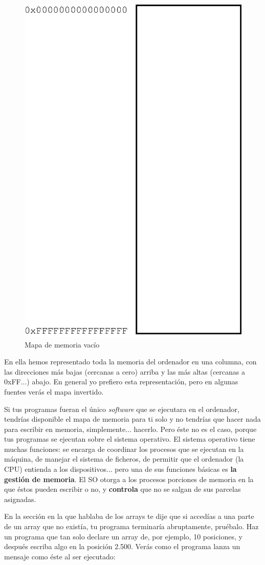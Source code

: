 \documentclass[a4paper]{article}
\begin{document}
\begin{figure}[H]
    \center
    \includegraphics[width=0.5\linewidth]{emptyMemoryMap}
    \caption{Mapa de memoria vacío}
    \label{img:emptyMemoryMap}
\end{figure}
En ella hemos representado toda la memoria del ordenador en una columna, con
las direcciones más bajas (cercanas a cero) arriba y las más altas (cercanas
a 0xFF...) abajo. En general yo prefiero esta representación, pero en algunas
fuentes verás el mapa invertido.

Si tus programas fueran el único \textit{software} que se ejecutara en el
ordenador, tendrías disponible el mapa de memoria para ti solo y no tendrías
que hacer nada para escribir en memoria, simplemente... hacerlo. Pero éste
no es el caso, porque tus programas se ejecutan sobre el sistema operativo.
El sistema operativo tiene muchas funciones: se encarga de coordinar los
procesos que se ejecutan en la máquina, de manejar el sistema de ficheros,
de permitir que el ordenador (la CPU) entienda a los dispositivos... pero
una de sus funciones básicas es \textbf{la gestión de memoria}. El SO
otorga a los procesos porciones de memoria en la que éstos pueden escribir
o no, y \textbf{controla} que no se salgan de sus parcelas asignadas.

En la sección en la que hablaba de los arrays te dije que si accedías a una
parte de un array que no existía, tu programa terminaría abruptamente, pruébalo.
Haz un programa que tan solo declare un array de, por ejemplo, 10 posiciones, y
después escriba algo en la posición 2.500. Verás como el programa lanza un
mensaje como éste al ser ejecutado:
\end{document}
